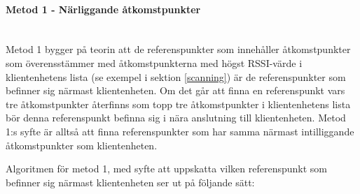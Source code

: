 \documentclass[a4paper,12pt]{article}
\begin{document}
 \paragraph{Metod 1 - Närliggande åtkomstpunkter}
 \leavevmode\\
 Metod 1 bygger på teorin att de referenspunkter som innehåller åtkomstpunkter som överensstämmer med åtkomstpunkterna med högst RSSI-värde i klientenhetens lista (se exempel i sektion \ref{scanning}) är de referenspunkter som befinner sig närmast klientenheten. Om det går att finna en referenspunkt vars tre åtkomstpunkter återfinns som topp tre åtkomstpunkter i klientenhetens lista bör denna referenspunkt befinna sig i nära anslutning till klientenheten.
 Metod 1:s syfte är alltså att finna referenspunkter som har samma närmast intilliggande åtkomstpunkter som klientenheten.

 Algoritmen för metod 1, med syfte att uppskatta vilken referenspunkt som befinner sig närmast klientenheten ser ut på följande sätt:
\end{document}
